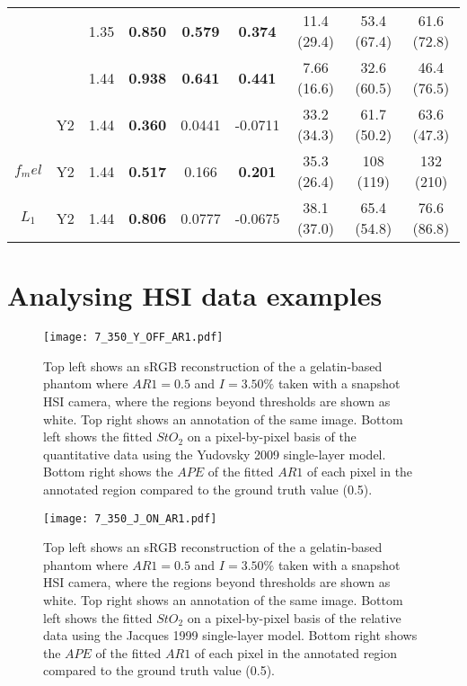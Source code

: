 \begin{table}[htb!]
\begin{tabular}{|ccc|ccc|ccc|}
        & & 1.35 & \textbf{0.850} & \textbf{0.579} & \textbf{0.374} & 11.4 (29.4) & 53.4 (67.4) & 61.6 (72.8) \\
        & & 1.44 & \textbf{0.938} & \textbf{0.641} & \textbf{0.441} & 7.66 (16.6) & 32.6 (60.5) & 46.4 (76.5) \\
        \cline{2-9}
        & Y2 & 1.44 & \textbf{0.360} & 0.0441 & -0.0711 & 33.2 (34.3) & 61.7 (50.2) & 63.6 (47.3) \\
        \hline
        $f_mel$ & Y2 & 1.44 & \textbf{0.517} & 0.166 & \textbf{0.201} & 35.3 (26.4) & 108 (119) & 132 (210) \\
        \hline
        $L_1$ & Y2 & 1.44 & \textbf{0.806} & 0.0777 & -0.0675 & 38.1 (37.0) & 65.4 (54.8) & 76.6 (86.8) \\
        \hline
    \end{tabular}    
    \label{ap:backwardsHSIMCr}
\end{table}
\FloatBarrier
\section{Analysing HSI data examples}

\begin{figure}[h!]
    \centering 
    \texttt{[image: 7\_350\_Y\_OFF\_AR1.pdf]}
    \caption{Top left shows an sRGB reconstruction of the a gelatin-based phantom where $AR1=0.5$ and $I=3.50\%$ taken with a snapshot HSI camera, where the regions beyond thresholds are shown as white. Top right shows an annotation of the same image. Bottom left shows the fitted $StO_2$ on a pixel-by-pixel basis of the quantitative data using the Yudovsky 2009 single-layer model. Bottom right shows the $APE$ of the fitted $AR1$ of each pixel in the annotated region compared to the ground truth value (0.5).}
    \label{ap:gelatinpbpegQY}
\end{figure}

\begin{figure}[h!]
    \centering 
    \texttt{[image: 7\_350\_J\_ON\_AR1.pdf]}
    \caption{Top left shows an sRGB reconstruction of the a gelatin-based phantom where $AR1=0.5$ and $I=3.50\%$ taken with a snapshot HSI camera, where the regions beyond thresholds are shown as white. Top right shows an annotation of the same image. Bottom left shows the fitted $StO_2$ on a pixel-by-pixel basis of the relative data using the Jacques 1999 single-layer model. Bottom right shows the $APE$ of the fitted $AR1$ of each pixel in the annotated region compared to the ground truth value (0.5).}
    \label{ap:gelatinpbpegRJ}
\end{figure}

